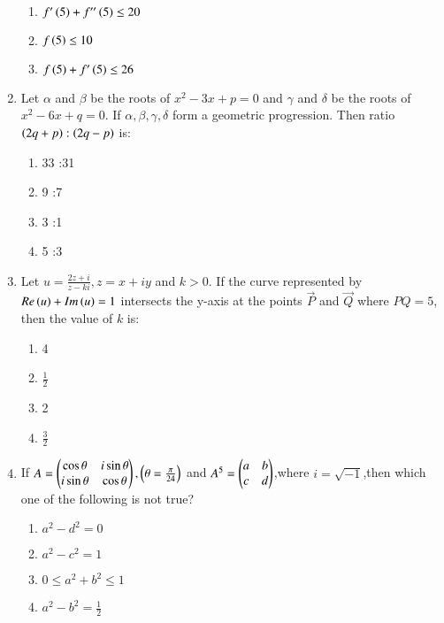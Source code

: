 \documentclass[journal]{IEEEtran}
\begin{document}
\begin{enumerate}
\begin{enumerate}
    \item $f^\prime\left(5\right)+f'^\prime\left(5\right)\leq20$
    \item $f\left(5\right)\leq10$
    \item $f\left(5\right)+f^\prime\left(5\right)\leq26$
\end{enumerate}
\item Let $\alpha$ and $\beta$ be the roots of $x^2-3x+p=0$ and $\gamma$ and $\delta$ be the roots of $x^2-6x+q=0$. If $\alpha,\beta,\gamma,\delta$ form a geometric progression. Then ratio $\left(2q+p\right):\left(2q-p\right)$ is:
\begin{enumerate}
    \item 33 :31
    \item 9 :7
    \item 3 :1
    \item 5 :3
\end{enumerate}
\item Let $u=\frac{2z+i}{z-ki},z=x+iy$ and $k>0$. If the curve represented by $Re\left(u\right)+Im\left(u\right)=1$ intersects the y-axis at the points $\vec{P}$ and $\vec{Q}$ where $PQ=5$, then the value of $k$ is:
\begin{enumerate}
    \item 4
    \item $\frac{1}{2}$
    \item 2
    \item $\frac{3}{2}$
\end{enumerate}
\item If $A=\begin{pmatrix}\cos\theta&i\sin\theta\\i\sin\theta&\cos\theta\end{pmatrix},\left(\theta=\frac{\pi}{24}\right)$ and $A^5=\begin{pmatrix}a&b\\c&d\end{pmatrix}$,where $i=\sqrt{-1}$,then which one of the following is not true?
\begin{enumerate}
    \item $a^2-d^2=0$
    \item $a^2-c^2=1$
    \item $0\leq a^2+b^2\leq1$
    \item $a^2-b^2=\frac{1}{2}$
\end{enumerate}

\end{enumerate}
\end{document}
